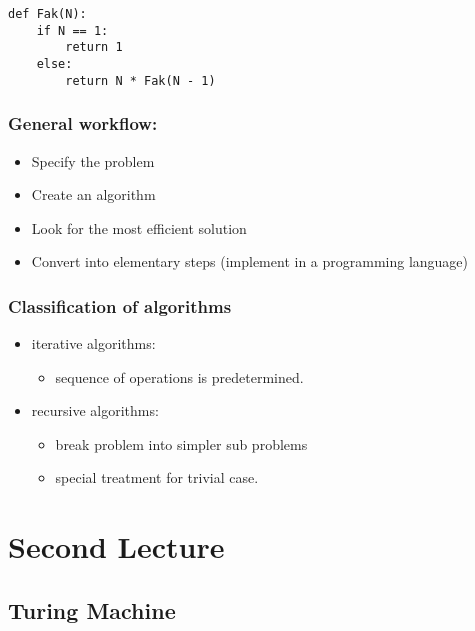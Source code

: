 \documentclass[a4paper]{article}
\begin{document}
\begin{lstlisting}
def Fak(N):
    if N == 1:
        return 1
    else:
        return N * Fak(N - 1)
\end{lstlisting}
\subsubsection{General workflow:}
\begin{itemize}
    \item Specify the problem
    \item Create an algorithm
    \item Look for the most efficient solution
    \item Convert into elementary steps (implement in a programming language)
\end{itemize}
\subsubsection{Classification of algorithms}
\begin{itemize}
    \item iterative algorithms:
        \begin{itemize}
            \item sequence of operations is predetermined.
        \end{itemize}
    \item recursive algorithms:
        \begin{itemize}
            \item break problem into simpler sub problems
            \item special treatment for trivial case.
        \end{itemize}
\end{itemize}

\section{Second Lecture}
\subsection{Turing Machine}
\end{document}
